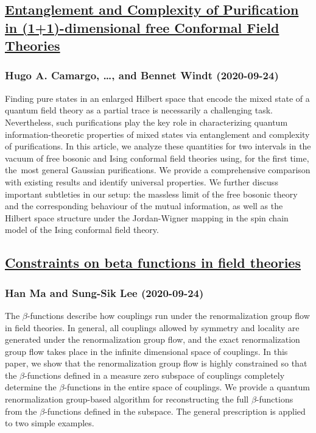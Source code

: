 \subsection*{\href{http://arxiv.org/abs/2009.11881v1}{Entanglement and Complexity of Purification in (1+1)-dimensional free  Conformal Field Theories}}
\subsubsection*{Hugo A. Camargo, \dots, and Bennet Windt (2020-09-24)}
Finding pure states in an enlarged Hilbert space that encode the mixed state
of a quantum field theory as a partial trace is necessarily a challenging task.
Nevertheless, such purifications play the key role in characterizing quantum
information-theoretic properties of mixed states via entanglement and
complexity of purifications. In this article, we analyze these quantities for
two intervals in the vacuum of free bosonic and Ising conformal field theories
using, for the first time, the~most general Gaussian purifications. We provide
a comprehensive comparison with existing results and identify universal
properties. We further discuss important subtleties in our setup: the massless
limit of the free bosonic theory and the corresponding behaviour of the mutual
information, as well as the Hilbert space structure under the Jordan-Wigner
mapping in the spin chain model of the Ising conformal field theory.

\subsection*{\href{http://arxiv.org/abs/2009.11880v1}{Constraints on beta functions in field theories}}
\subsubsection*{Han Ma and Sung-Sik Lee (2020-09-24)}
The $\beta$-functions describe how couplings run under the renormalization
group flow in field theories. In general, all couplings allowed by symmetry and
locality are generated under the renormalization group flow, and the exact
renormalization group flow takes place in the infinite dimensional space of
couplings. In this paper, we show that the renormalization group flow is highly
constrained so that the $\beta$-functions defined in a measure zero subspace of
couplings completely determine the $\beta$-functions in the entire space of
couplings. We provide a quantum renormalization group-based algorithm for
reconstructing the full $\beta$-functions from the $\beta$-functions defined in
the subspace. The general prescription is applied to two simple examples.

